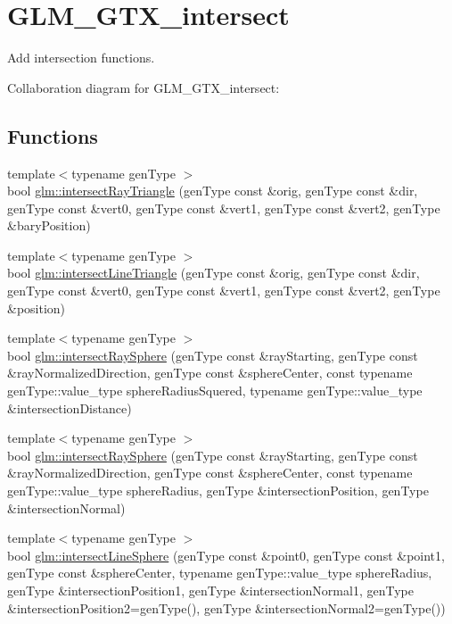 \hypertarget{group__gtx__intersect}{}\section{G\+L\+M\+\_\+\+G\+T\+X\+\_\+intersect}
\label{group__gtx__intersect}


Add intersection functions.  


Collaboration diagram for G\+L\+M\+\_\+\+G\+T\+X\+\_\+intersect\+:
\subsection*{Functions}
\begin{DoxyCompactItemize}
\item 
{\footnotesize template$<$typename gen\+Type $>$ }\\bool \hyperlink{group__gtx__intersect_gac8bcfc662702cc5ae4463a7f95c35ed4}{glm\+::intersect\+Ray\+Triangle} (gen\+Type const \&orig, gen\+Type const \&dir, gen\+Type const \&vert0, gen\+Type const \&vert1, gen\+Type const \&vert2, gen\+Type \&bary\+Position)
\item 
{\footnotesize template$<$typename gen\+Type $>$ }\\bool \hyperlink{group__gtx__intersect_ga54942f4d0fc37afdd866e79a4b8b997f}{glm\+::intersect\+Line\+Triangle} (gen\+Type const \&orig, gen\+Type const \&dir, gen\+Type const \&vert0, gen\+Type const \&vert1, gen\+Type const \&vert2, gen\+Type \&position)
\item 
{\footnotesize template$<$typename gen\+Type $>$ }\\bool \hyperlink{group__gtx__intersect_ga916045826fbdb82ec0ec393c66065c95}{glm\+::intersect\+Ray\+Sphere} (gen\+Type const \&ray\+Starting, gen\+Type const \&ray\+Normalized\+Direction, gen\+Type const \&sphere\+Center, const typename gen\+Type\+::value\+\_\+type sphere\+Radius\+Squered, typename gen\+Type\+::value\+\_\+type \&intersection\+Distance)
\item 
{\footnotesize template$<$typename gen\+Type $>$ }\\bool \hyperlink{group__gtx__intersect_ga5b3915fd8ab76d3e3d9a98869d9a3c44}{glm\+::intersect\+Ray\+Sphere} (gen\+Type const \&ray\+Starting, gen\+Type const \&ray\+Normalized\+Direction, gen\+Type const \&sphere\+Center, const typename gen\+Type\+::value\+\_\+type sphere\+Radius, gen\+Type \&intersection\+Position, gen\+Type \&intersection\+Normal)
\item 
{\footnotesize template$<$typename gen\+Type $>$ }\\bool \hyperlink{group__gtx__intersect_ga029b0fdc889428d905a6267aee1f0f25}{glm\+::intersect\+Line\+Sphere} (gen\+Type const \&point0, gen\+Type const \&point1, gen\+Type const \&sphere\+Center, typename gen\+Type\+::value\+\_\+type sphere\+Radius, gen\+Type \&intersection\+Position1, gen\+Type \&intersection\+Normal1, gen\+Type \&intersection\+Position2=gen\+Type(), gen\+Type \&intersection\+Normal2=gen\+Type())
\end{DoxyCompactItemize}



